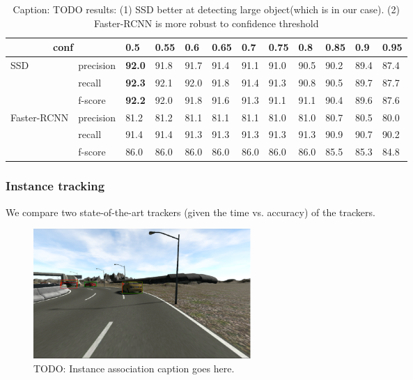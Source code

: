 \documentclass[10pt,twocolumn,letterpaper]{article}
\newcommand{\ra}[1]{\renewcommand{\arraystretch}{#1}}
\begin{document}
\begin{table}\centering
\ra{1.}
\begin{tabular}{@{}llllllllllll@{}}\toprule
\multicolumn{2}{c}{conf}  & 0.5  & 0.55 & 0.6 &  0.65 & 0.7  & 0.75 & 0.8 &  0.85 & 0.9  & 0.95\\
\hline
\multirow{3}{*}{SSD}&   precision & \textbf{92.0 } & 91.8 & 91.7 & 91.4 & 91.1 & 91.0 & 90.5 & 90.2 & 89.4 & 87.4\\
                    &    recall   & \textbf{92.3}  & 92.1 & 92.0 & 91.8 & 91.4 & 91.3 & 90.8 & 90.5 & 89.7 & 87.7\\
                    &    f-score  & \textbf{92.2 } & 92.0 & 91.8 & 91.6 & 91.3 & 91.1 & 91.1 & 90.4 & 89.6 & 87.6\\
\multirow{3}{*}{Faster-RCNN}
                    &   precision & 81.2  & 81.2  & 81.1 & 81.1 & 81.1 & 81.0 & 81.0 & 80.7 & 80.5 & 80.0 \\
                    &   recall    & 91.4  & 91.4  & 91.3 & 91.3 & 91.3 & 91.3 & 91.3 & 90.9 & 90.7 & 90.2\\
                    &   f-score   & 86.0  & 86.0  & 86.0 & 86.0 & 86.0 & 86.0 & 86.0 & 85.5 & 85.3 & 84.8\\
\bottomrule
\end{tabular}
\caption{Caption: TODO results: (1) SSD better at detecting large object(which is in our case). (2) Faster-RCNN  is more robust to confidence threshold}
\label{tab:ssd_fasterrcnn}
\end{table}

\subsubsection{Instance tracking}

We compare two state-of-the-art trackers (given the time vs. accuracy) of the trackers.
\begin{figure}[t]
        \centering
        \includegraphics[width=0.4\textwidth]{figures/double_detection.png}
        \caption{ {\small TODO: Instance association caption goes here.}}
        \label{fig:Instance_associationn}
\end{figure}
\end{document}
